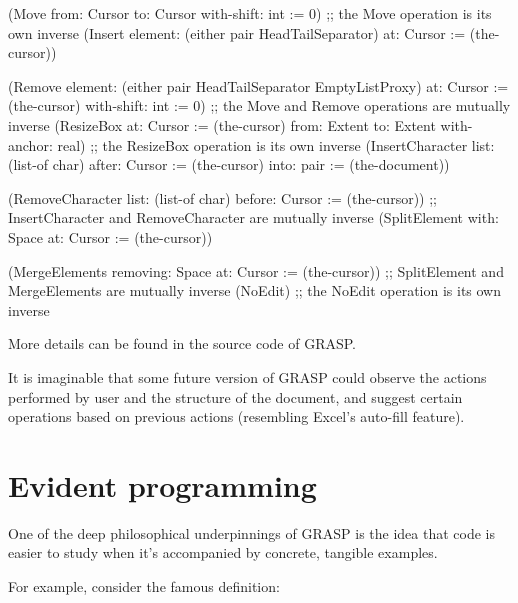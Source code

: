 \documentclass[sigconf]{acmart}
\newenvironment{Snippet}{\Verbatim[samepage=true]}{\endVerbatim}
\begin{document}
\begin{Snippet}
(Move from: Cursor
      to: Cursor
      with-shift: int := 0)
;; the Move operation is its own inverse
\end{Snippet}
\begin{Snippet}
(Insert element: (either pair HeadTailSeparator)
	at: Cursor := (the-cursor))

(Remove element: (either pair
			 HeadTailSeparator
			 EmptyListProxy)
	at: Cursor := (the-cursor)
	with-shift: int := 0)
;; the Move and Remove operations are mutually inverse
\end{Snippet}
\begin{Snippet}
(ResizeBox at: Cursor := (the-cursor)
	   from: Extent
	   to: Extent
	   with-anchor: real)
;; the ResizeBox operation is its own inverse
\end{Snippet}
\begin{Snippet}
(InsertCharacter list: (list-of char)
		 after: Cursor := (the-cursor)
		 into: pair := (the-document))

(RemoveCharacter list: (list-of char)
		 before: Cursor := (the-cursor))
;; InsertCharacter and RemoveCharacter are mutually inverse
\end{Snippet}
\begin{Snippet}
(SplitElement with: Space
	      at: Cursor := (the-cursor))

(MergeElements removing: Space
	       at: Cursor := (the-cursor))
;; SplitElement and MergeElements are mutually inverse
\end{Snippet}
\begin{Snippet}
(NoEdit)
;; the NoEdit operation is its own inverse
\end{Snippet}

More details can be found in the source code
of GRASP.

It is imaginable that some future version
of GRASP could observe the actions performed
by user and the structure of the document,
and suggest certain operations based on
previous actions (resembling Excel's auto-fill
feature).

\section{Evident programming}

One of the deep philosophical underpinnings
of GRASP is the idea that code is easier to study
when it's accompanied by concrete, tangible examples.

For example, consider the famous definition:
\end{document}
